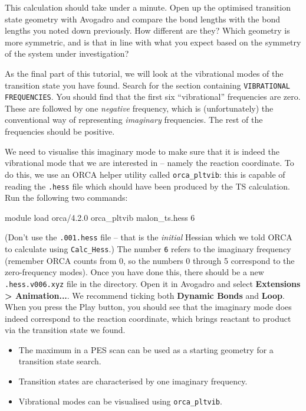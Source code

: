 \documentclass[10pt]{article}
\begin{document}
This calculation should take under a minute. Open up the optimised transition state geometry with Avogadro and compare the  bond lengths with the bond lengths you noted down previously. How different are they? Which geometry is more symmetric, and is that in line with what you expect based on the symmetry of the system under investigation?

As the final part of this tutorial, we will look at the vibrational modes of the transition state you have found. Search for the section containing \texttt{VIBRATIONAL FREQUENCIES}. You should find that the first six ``vibrational'' frequencies are zero. These are followed by one \textit{negative} frequency, which is (unfortunately) the conventional way of representing \textit{imaginary} frequencies. The rest of the frequencies should be positive.

We need to visualise this imaginary mode to make sure that it is indeed the vibrational mode that we are interested in -- namely the reaction coordinate. To do this, we use an ORCA helper utility called \texttt{orca\_pltvib}: this is capable of reading the \texttt{.hess} file which should have been produced by the TS calculation. Run the following two commands:

\begin{cmdline}
module load orca/4.2.0
orca_pltvib malon_ts.hess 6
\end{cmdline}

(Don't use the \texttt{.001.hess} file -- that is the \textit{initial} Hessian which we told ORCA to calculate using \texttt{Calc\_Hess}.) The number \texttt{6} refers to the imaginary frequency (remember ORCA counts from 0, so the numbers 0 through 5 correspond to the zero-frequency modes). Once you have done this, there should be a new \texttt{.hess.v006.xyz} file in the directory. Open it in Avogadro and select \textbf{Extensions > Animation...}. We recommend ticking both \textbf{Dynamic Bonds} and \textbf{Loop}. When you press the Play button, you should see that the imaginary mode does indeed correspond to the reaction coordinate, which brings reactant to product via the transition state we found.

\begin{summary}
    \begin{itemize}[leftmargin=0.6cm]
        \item The maximum in a PES scan can be used as a starting geometry for a transition state search.
        \item Transition states are characterised by one imaginary frequency.
        \item Vibrational modes can be visualised using \texttt{orca\_pltvib}.
    \end{itemize}
\end{summary}
\end{document}
